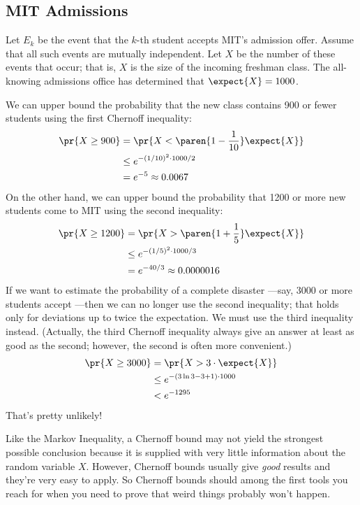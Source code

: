 \begin{editingnotes}
\subsection{MIT Admissions}

Let $E_k$ be the event that the $k$-th student accepts MIT's admission
offer.  Assume that all such events are mutually independent.  Let $X$
be the number of these events that occur; that is, $X$ is the size of
the incoming freshman class.  The all-knowing admissions office has
determined that $\expect{X} = 1000$.

We can upper bound the probability that the new class contains 900 or
fewer students using the first Chernoff inequality:
%
\begin{align*}
\pr{X \geq 900}
    & = \pr{X < \paren{1 - \frac{1}{10}} \expect{X}} \\
    & \leq e^{- (1/10)^2 \cdot 1000 / 2} \\
    & = e^{-5} \approx 0.0067
\end{align*}
%
On the other hand, we can upper bound the probability that 1200 or
more new students come to MIT using the second inequality:
%
\begin{align*}
\pr{X \geq 1200}
    & = \pr{X > \paren{1 + \frac{1}{5}} \expect{X}} \\
    & \leq e^{- (1/5)^2 \cdot 1000 / 3} \\
    & = e^{-40/3} \approx 0.0000016
\end{align*}
%
If we want to estimate the probability of a complete disaster ---say,
3000 or more students accept ---then we can no longer use the second
inequality; that holds only for deviations up to twice the
expectation.  We must use the third inequality instead.  (Actually,
the third Chernoff inequality always give an answer at least as good
as the second; however, the second is often more convenient.)
%
\begin{align*}
\pr{X \geq 3000}
    & = \pr{X > 3 \cdot \expect{X}} \\
    & \leq e^{-(3 \ln 3 - 3 + 1) \cdot 1000} \\
    & < e^{-1295}
\end{align*}
%
That's pretty unlikely!  

Like the Markov Inequality, a Chernoff bound may not yield the
strongest possible conclusion because it is supplied with very little
information about the random variable $X$.  However, Chernoff bounds
usually give \textit{good} results and they're very easy to apply.  So
Chernoff bounds should among the first tools you reach for when you
need to prove that weird things probably won't happen.


\end{editingnotes}
